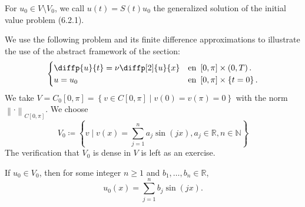 \begin{frame}
	\frametitle{\insertsection}

	\begin{definition}
		For $u_{0}\in V\setminus V_{0}$, we call
		$u\left(t\right)=S\left(t\right)u_{0}$ the generalized solution of the initial value problem
		(6.2.1).
	\end{definition}

	\begin{example}
		We use the following problem and its finite difference
		approximations to illustrate the use of the abstract framework of
		the section:
		\begin{equation*}
			\begin{cases}\displaystyle
				\diffp{u}{t}=
				\nu
				\diffp[2]{u}{x} &
				\text{en }\left[0,\pi\right]\times\left(0,T\right). \\
				u=u_{0}         &
				\text{en }\left[0,\pi\right]\times\left\{t=0\right\}.
			\end{cases}
		\end{equation*}
		We take $V=C_{0}\left[0,\pi\right]=\left\{v\in C\left[0,\pi\right]\mid v\left(0\right)=v\left(\pi\right)=0\right\}$
		with the norm $\left\|\cdot\right\|_{C\left[0,\pi\right]}$.
		We choose
		\begin{equation*}
			V_{0}\coloneqq
			\left\{
			v\mid
			v\left(x\right)=
			\sum_{j=1}^{n}a_{j}\sin\left(jx\right),
			a_{j}\in\mathbb{R},
			n\in\mathbb{N}
			\right\}
		\end{equation*}
		The verification that $V_{0}$ is dense in $V$ is left as an exercise.
	\end{example}
	If $u_{0}\in V_{0}$, then for some integer $n\geq 1$ and $b_{1},\dotsc,b_{n}\in\mathbb{R}$,
	\begin{equation*}
		u_{0}\left(x\right)=
		\sum_{j=1}^{n}
		b_{j}\sin\left(jx\right).
	\end{equation*}
\end{frame}

